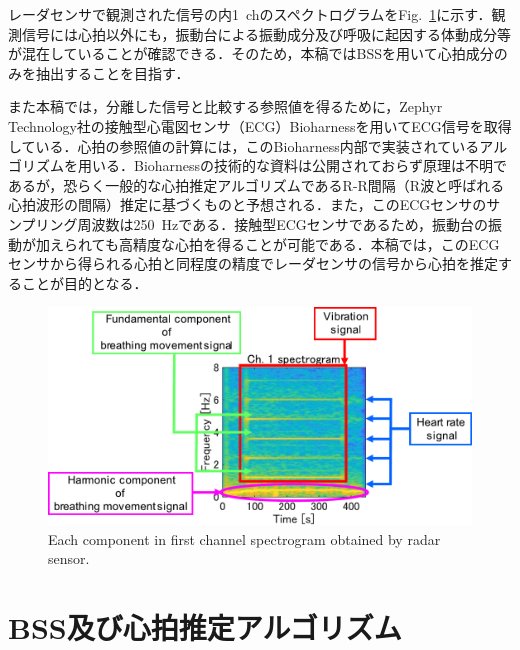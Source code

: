 \documentclass[10.5pt]{jarticle}
\begin{document}
\hspace{1.0em}レーダセンサで観測された信号の内1~chのスペクトログラムをFig.~\ref{fig:1chobs}に示す．観測信号には心拍以外にも，振動台による振動成分及び呼吸に起因する体動成分等が混在していることが確認できる．そのため，本稿ではBSSを用いて心拍成分のみを抽出することを目指す．

また本稿では，分離した信号と比較する参照値を得るために，Zephyr Technology社の接触型心電図センサ（ECG）Bioharnessを用いてECG信号を取得している．心拍の参照値の計算には，このBioharness内部で実装されているアルゴリズムを用いる．Bioharnessの技術的な資料は公開されておらず原理は不明であるが，恐らく一般的な心拍推定アルゴリズムであるR-R間隔（R波と呼ばれる心拍波形の間隔）推定に基づくものと予想される．また，このECGセンサのサンプリング周波数は250~Hzである．接触型ECGセンサであるため，振動台の振動が加えられても高精度な心拍を得ることが可能である．本稿では，このECGセンサから得られる心拍と同程度の精度でレーダセンサの信号から心拍を推定することが目的となる．

\begin{figure}[tb]
  \centering
  \vspace{0pt} %
  \includegraphics[width=1.0\columnwidth]{1chobsspect.pdf}
  \vspace{-20pt} %
  \caption{Each component in first channel spectrogram obtained by radar sensor.}
  \vspace{-20pt} %
  \label{fig:1chobs}
\end{figure}

\section{BSS及び心拍推定アルゴリズム}
\end{document}
